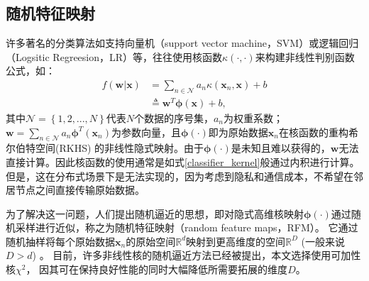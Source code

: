 \subsection{随机特征映射}\label{char:RFM}
许多著名的分类算法如支持向量机（support vector machine，SVM）或逻辑回归（Logsitic Regreesion，LR）等，往往使用核函数$\kappa\left(\cdot, \cdot\right)$来构建非线性判别函数公式，如：
\begin{equation}
    \label{classifier_kernel}
    \begin{split}
        f(\boldsymbol w|\boldsymbol x)
        &=\sum_{n \in \mathcal{N}} a_{n} \kappa\left(\boldsymbol x_{n}, \boldsymbol x\right)+b\\
        &\triangleq \boldsymbol w^{T} \boldsymbol \phi(\boldsymbol x)+b,
    \end{split}
\end{equation}
其中$\mathcal{N}=\left\{1,2,...,N\right\}$代表$N$个数据的序号集，$a_n$为权重系数；
$\boldsymbol{w} =\sum_{n \in \mathcal{N}}a_n {\boldsymbol\phi^T(\boldsymbol{x}_{n})}$为参数向量，且$\boldsymbol\phi\left(\boldsymbol{\cdot}\right)$即为原始数据$\boldsymbol{x}_{n}$在核函数的重构希尔伯特空间(RKHS)
的非线性隐式映射。由于$\boldsymbol\phi\left(\boldsymbol{\cdot}\right)$是未知且难以获得的，$\boldsymbol w$无法直接计算。因此核函数的使用通常是如式\eqref{classifier_kernel}般通过内积进行计算。但是，这在分布式场景下是无法实现的，因为考虑到隐私和通信成本，不希望在邻居节点之间直接传输原始数据。

为了解决这一问题，人们提出随机逼近的思想，即对隐式高维核映射$\boldsymbol\phi\left(\boldsymbol{\cdot}\right)$通过随机采样进行近似，称之为随机特征映射（random feature maps，RFM）。
它通过随机抽样将每个原始数据$\boldsymbol{x}_{n}$的原始空间$\mathbb{R}^d$映射到更高维度的空间$\mathbb{R}^D$
(一般来说$D>d$) \cite{Yuan_Efficient_2015}。
目前，许多非线性核的随机逼近方法已经被提出，本文选择使用可加性核$\chi^2$，
因其可在保持良好性能的同时大幅降低所需要拓展的维度$D$\cite{Yuan_Efficient_2015,Vedaldi_Efficient_2012}。

